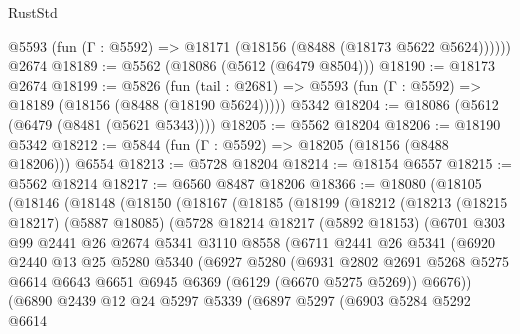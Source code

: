 \begin{lexlean}{RustStd}
\begin{coremodule}
      @5593 (fun (Γ : @5592) => @18171 (@18156 (@8488 (@18173 @5622 @5624))))))
    @2674
@18189 := @5562 (@18086 (@5612 (@6479 @8504)))
@18190 := @18173 @2674
@18199 := @5826
    (fun (tail : @2681) => @5593 (fun (Γ : @5592) => @18189 (@18156 (@8488 (@18190 @5624)))))
    @5342
@18204 := @18086 (@5612 (@6479 (@8481 (@5621 @5343))))
@18205 := @5562 @18204
@18206 := @18190 @5342
@18212 := @5844 (fun (Γ : @5592) => @18205 (@18156 (@8488 @18206))) @6554
@18213 := @5728 @18204
@18214 := @18154 @6557
@18215 := @5562 @18214
@18217 := @6560 @8487 @18206
@18366 := @18080
    (@18105
      (@18146
        (@18148
          (@18150
            (@18167
              (@18185
                (@18199
                  (@18212
                    (@18213
                      (@18215 @18217)
                      (@5887 @18085)
                      (@5728
                        @18214
                        @18217
                        (@5892 @18153)
                        (@6701
                          @303
                          @99
                          @2441
                          @26
                          @2674
                          @5341
                          @3110
                          @8558
                          (@6711
                            @2441
                            @26
                            @5341
                            (@6920
                              @2440
                              @13
                              @25
                              @5280
                              @5340
                              (@6927
                                @5280
                                (@6931
                                  @2802
                                  @2691
                                  @5268
                                  @5275
                                  @6614
                                  @6643
                                  @6651
                                  @6945
                                  @6369
                                  (@6129 (@6670 @5275 @5269))
                                  @6676))
                              (@6890
                                @2439
                                @12
                                @24
                                @5297
                                @5339
                                (@6897
                                  @5297
                                  (@6903
                                    @5284
                                    @5292
                                    @6614

\end{coremodule}
\end{lexlean}
